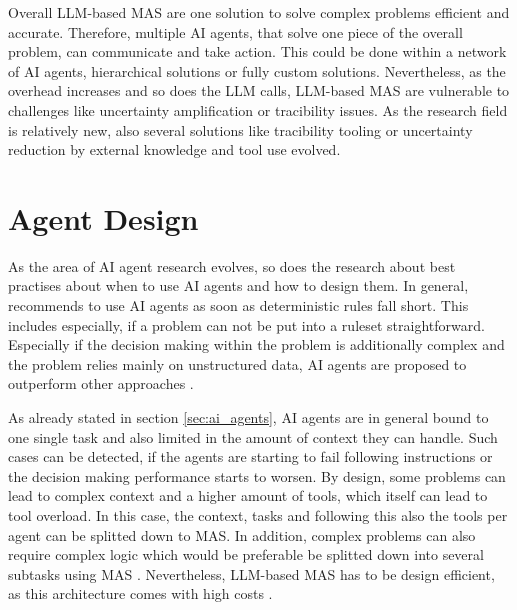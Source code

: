 \documentclass[a4paper,oneside,bibliography=totoc]{scrbook}
\begin{document}
Overall \ac{LLM}-based \ac{MAS} are one solution to solve complex problems efficient and accurate. Therefore, multiple \ac{AI} agents, that solve one piece of the overall problem, can communicate and take action. This could be done within a network of \ac{AI} agents, hierarchical solutions or fully custom solutions. Nevertheless, as the overhead increases and so does the \ac{LLM} calls, \ac{LLM}-based \ac{MAS} are vulnerable to challenges like uncertainty amplification or tracibility issues. As the research field is relatively new, also several solutions like tracibility tooling or uncertainty reduction by external knowledge and tool use evolved.

\section{Agent Design}
\label{sec:agent_design}

As the area of \ac{AI} agent research evolves, so does the research about best practises about when to use \ac{AI} agents and how to design them. In general, \citet{OpenAI2025} recommends to use \ac{AI} agents as soon as  deterministic rules fall short. This includes especially, if a problem can not be put into a ruleset straightforward. Especially if the decision making within the problem is additionally complex and the problem relies mainly on unstructured data, \ac{AI} agents are proposed to outperform other approaches \cite{OpenAI2025}.

As already stated in section \ref{sec:ai_agents}, \ac{AI} agents are in general bound to one single task and also limited in the amount of context they can handle. Such cases can be detected, if the agents are starting to fail following instructions or the decision making performance starts to worsen. By design, some problems can lead to complex context and a higher amount of tools, which itself can lead to tool overload. In this case, the context, tasks and following this also the tools per agent can be splitted down to \ac{MAS}. In addition, complex problems can also require complex logic which would be preferable be splitted down into several subtasks using \ac{MAS} \cite{OpenAI2025,LangChain2025b}. Nevertheless, \ac{LLM}-based \ac{MAS} has to be design efficient, as this architecture comes with high costs \cite{Hadfield2025}.
\end{document}
